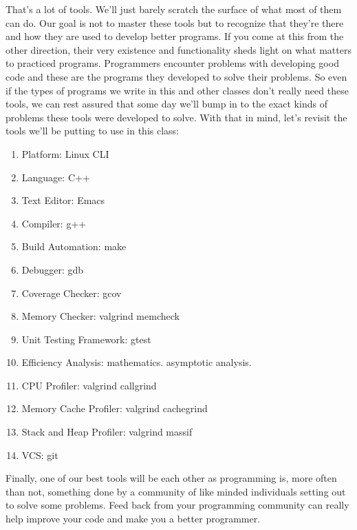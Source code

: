\documentclass[]{tufte-handout}
\begin{document}
That's a lot of tools.  We'll just barely scratch the surface of what most of them can do.  Our goal is not to master these tools but to recognize that they're there and how they are used to develop better programs. If you come at this from the other direction, their very existence and functionality sheds light on what matters to practiced programs.  Programmers encounter problems with developing good code and these are the programs they developed to solve their problems.  So even if the types of programs we write in this and other classes don't really need these tools, we can rest assured that some day we'll bump in to the exact kinds of problems these tools were developed to solve. With that in mind, let's revisit the tools we'll be putting to use in this class:
\begin{enumerate}
\item Platform: Linux CLI
\item Language: C++
\item Text Editor: Emacs
\item Compiler: g++
\item Build Automation: make
\item Debugger: gdb
\item Coverage Checker: gcov
\item Memory Checker: valgrind memcheck
\item Unit Testing Framework: gtest
\item Efficiency Analysis: mathematics. asymptotic analysis. 
\item CPU Profiler: valgrind callgrind
\item Memory Cache Profiler: valgrind cachegrind
\item Stack and Heap Profiler: valgrind massif
\item VCS: git
\end{enumerate}   
Finally, one of our best tools will be each other as programming is, more often than not, something done by a community of like minded individuals setting out to solve some problems. Feed back from your programming community can really help improve your code and make you a better programmer.  
\end{document}
